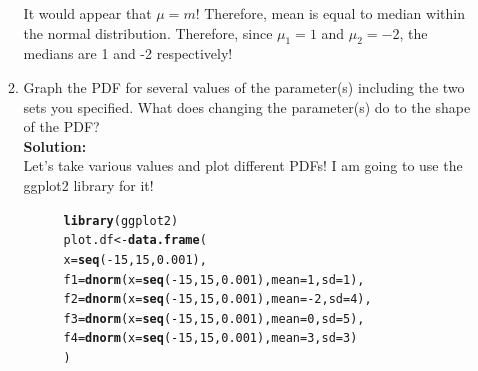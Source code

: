 \documentclass{article}\usepackage[]{graphicx}\usepackage[]{color}
\makeatletter
\newcommand{\hlnum}[1]{\textcolor[rgb]{0.686,0.059,0.569}{#1}}%
\newcommand{\hlopt}[1]{\textcolor[rgb]{0,0,0}{#1}}%
\newcommand{\hlstd}[1]{\textcolor[rgb]{0.345,0.345,0.345}{#1}}%
\newcommand{\hlkwb}[1]{\textcolor[rgb]{0.69,0.353,0.396}{#1}}%
\newcommand{\hlkwc}[1]{\textcolor[rgb]{0.333,0.667,0.333}{#1}}%
\newcommand{\hlkwd}[1]{\textcolor[rgb]{0.737,0.353,0.396}{\textbf{#1}}}%
\newenvironment{kframe}{%
 \def\at@end@of@kframe{}%
 \ifinner\ifhmode%
  \def\at@end@of@kframe{\end{minipage}}%
  \begin{minipage}{\columnwidth}%
 \fi\fi%
 \def\FrameCommand##1{\hskip\@totalleftmargin \hskip-\fboxsep
 \colorbox{shadecolor}{##1}\hskip-\fboxsep
     \hskip-\linewidth \hskip-\@totalleftmargin \hskip\columnwidth}%
 \MakeFramed {\advance\hsize-\width
   \@totalleftmargin\z@ \linewidth\hsize
   \@setminipage}}%
 {\par\unskip\endMakeFramed%
 \at@end@of@kframe}
\newenvironment{knitrout}{}{} %
\makeatother
\begin{document}
\begin{enumerate}
\begin{enumerate}
It would appear that $\mu=m!$ Therefore, mean is equal to median within the normal distribution. Therefore, since $\mu_{1}=1$ and $\mu_{2}=-2$, the medians are 1 and -2 respectively!
	\item \label{q1PDF} Graph the PDF for several values of the parameter(s) 
	including the two sets you specified. What does changing the parameter(s) do 
	to the shape of the PDF?\\
	
	\textbf{Solution:}\\
	Let's take various values and plot different PDFs! I am going to use  the ggplot2 \citep{ggplot2} library for it!
\begin{figure}[H]
\begin{center}
\begin{knitrout}
\color{fgcolor}\begin{kframe}
\begin{alltt}
\hlkwd{library}\hlstd{(ggplot2)}
\hlstd{plot.df} \hlkwb{<-} \hlkwd{data.frame}\hlstd{(}
  \hlkwc{x}\hlstd{=}\hlkwd{seq}\hlstd{(}\hlopt{-}\hlnum{15}\hlstd{,} \hlnum{15}\hlstd{,} \hlnum{0.001}\hlstd{),}
  \hlkwc{f1}\hlstd{=}\hlkwd{dnorm}\hlstd{(}\hlkwc{x}\hlstd{=}\hlkwd{seq}\hlstd{(}\hlopt{-}\hlnum{15}\hlstd{,} \hlnum{15}\hlstd{,} \hlnum{0.001}\hlstd{),} \hlkwc{mean}\hlstd{=}\hlnum{1}\hlstd{,} \hlkwc{sd}\hlstd{=}\hlnum{1}\hlstd{),}
  \hlkwc{f2}\hlstd{=}\hlkwd{dnorm}\hlstd{(}\hlkwc{x}\hlstd{=}\hlkwd{seq}\hlstd{(}\hlopt{-}\hlnum{15}\hlstd{,} \hlnum{15}\hlstd{,} \hlnum{0.001}\hlstd{),} \hlkwc{mean}\hlstd{=}\hlopt{-}\hlnum{2}\hlstd{,} \hlkwc{sd}\hlstd{=}\hlnum{4}\hlstd{),}
  \hlkwc{f3}\hlstd{=}\hlkwd{dnorm}\hlstd{(}\hlkwc{x}\hlstd{=}\hlkwd{seq}\hlstd{(}\hlopt{-}\hlnum{15}\hlstd{,} \hlnum{15}\hlstd{,} \hlnum{0.001}\hlstd{),} \hlkwc{mean}\hlstd{=}\hlnum{0}\hlstd{,} \hlkwc{sd}\hlstd{=}\hlnum{5}\hlstd{),}
  \hlkwc{f4}\hlstd{=}\hlkwd{dnorm}\hlstd{(}\hlkwc{x}\hlstd{=}\hlkwd{seq}\hlstd{(}\hlopt{-}\hlnum{15}\hlstd{,} \hlnum{15}\hlstd{,} \hlnum{0.001}\hlstd{),} \hlkwc{mean}\hlstd{=}\hlnum{3}\hlstd{,} \hlkwc{sd}\hlstd{=}\hlnum{3}\hlstd{)}
\hlstd{)}


\end{alltt}
\end{kframe}
\end{knitrout}
\end{center}
\end{figure}
\end{enumerate}
\end{enumerate}
\end{document}
